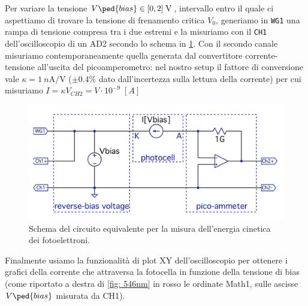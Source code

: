 \documentclass[10pt, a4paper, italian]{article}
\begin{document}
Per variare la tensione $V\ped{bias} \in [0, 2] \; \si{\V}$, intervallo entro
il quale ci aspettiamo di trovare la tensione di frenamento critica $V_0$,
generiamo in \verb+WG1+ una rampa di tensione compresa tra i due estremi e la
misuriamo con il \verb+CH1+ dell'oscilloscopio di un AD2 secondo lo schema in
\cref{schm: Imeas}.
Con il secondo canale misuriamo contemporaneamente quella generata dal
convertitore corrente-tensione all'uscita del picoamperometro: nel
nostro setup il fattore di conversione vale $\kappa = \SI{1}{n\A/\V}$
($\pm 0.4 \%$ dato dall'incertezza sulla lettura della corrente)
per cui misuriamo $I = \kappa V_{CH2} = V \cdot 10^{-9} \; [\si{A}]$
\begin{figure}[htbp]
    \centering
	\includegraphics[scale=0.2]{schm}
    \caption{Schema del circuito equivalente per la misura dell'energia
    cinetica dei fotoelettroni.
    \label{schm: Imeas}}
\end{figure}

Finalmente usiamo la funzionalità di plot XY dell'oscilloscopio per ottenere
i grafici della corrente che attraversa la fotocella in funzione della
tensione di bias (come riportato a destra di \cref{fig: 546nm} in rosso le
ordinate Math1, sulle ascisse $V\ped{bias}$ misurata da CH1).
\end{document}
